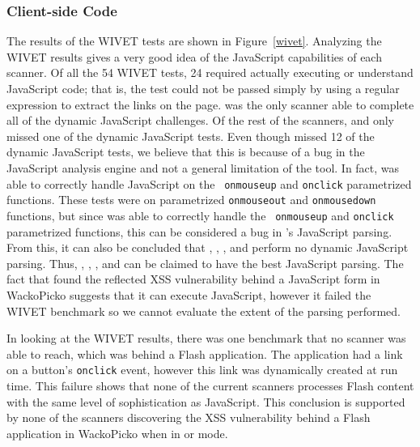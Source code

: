 \subsubsection{Client-side Code}
The results of the WIVET tests are shown in Figure~\ref{wivet}.
Analyzing  the  WIVET  results  gives  a  very good  idea  of  the  JavaScript
capabilities of each scanner. Of all the 54 WIVET tests, 
24 required actually executing  or understand JavaScript code; that  is, the test
could not  be passed  simply by  using a regular  expression to
extract the links on  the page. 
\webinspect{} was  the only scanner
able to complete  all of the dynamic 
JavaScript  challenges.   Of  the  rest  of  the   scanners,  \acunetix{}  and
\ntospider{} only missed one of the dynamic JavaScript tests. 
Even though \hailstorm{} missed 12 of
the dynamic JavaScript  tests, we believe that this is because of a bug in the 
JavaScript analysis engine and not a general limitation of the tool. In fact,
\hailstorm{} was able to correctly handle JavaScript on the {\tt
onmouseup} and {\tt  onclick} parametrized functions. 
These tests were on parametrized  {\tt onmouseout} and
{\tt onmousedown} functions,  but since \hailstorm{} was able  to correctly handle the {\tt
onmouseup} and {\tt  onclick} parametrized functions, this can  be considered a
bug in \hailstorm{}'s JavaScript parsing.  From this, it can also be concluded
that \appscan{},  \grendelscan{}, \milescan{},  and \waf{} perform  no dynamic
JavaScript   parsing.  Thus,   \webinspect,  \acunetix{},   \ntospider{},  and
\hailstorm{} can  be claimed  to have the  best JavaScript parsing.   The fact
that \nstalker{}  found the reflected  XSS vulnerability behind  a JavaScript
form in WackoPicko suggests that  it can execute JavaScript, however it failed
the WIVET benchmark so we cannot evaluate the extent of the parsing performed.


In looking at the WIVET results, there was one benchmark that no scanner was
able to reach, which was behind a Flash application. The application had a
link on a button's {\tt onclick} event, however this link was dynamically
created at run time. This failure shows that none of the
current scanners processes Flash content with the same level of
sophistication as JavaScript.  This conclusion is supported by none of
the scanners discovering the XSS vulnerability behind a Flash
application in WackoPicko when in \initial{} or \config{} mode.


